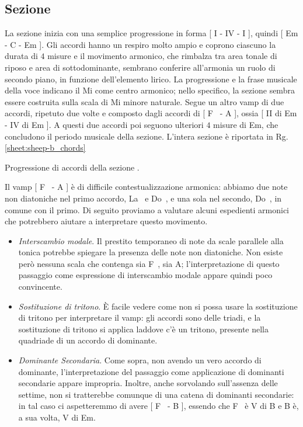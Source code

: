 \documentclass[class=book, crop=false, oneside, 12pt]{standalone}
\begin{document}
    \subsection{Sezione }
    La sezione  inizia con una semplice progressione in forma [ I - IV - I ], quindi [ Em - C - Em ]. Gli accordi hanno un respiro molto ampio e coprono ciascuno la durata di \(4\) misure e il movimento armonico, che rimbalza tra area tonale di riposo e area di sottodominante, sembrano conferire all'armonia un ruolo di secondo piano, in funzione dell'elemento lirico. La progressione e la frase musicale della voce indicano il Mi come centro armonico; nello specifico, la sezione sembra essere costruita sulla scala di Mi minore naturale.
    Segue un altro vamp di due accordi, ripetuto due volte e composto dagli accordi di [ F\sharp~ - A ], ossia [ II di Em - IV di Em ].  A questi due accordi poi seguono ulteriori \(4\) misure di Em, che concludono il periodo musicale della sezione. L'intera sezione è riportata in Rg.\ref{sheet:sheep-b_chords}

    \begin{sheet}[htb]
        \centering
        \caption{Progressione di accordi della sezione .}
        \label{sheet:sheep-b_chords}
    \end{sheet}
    

    Il vamp [ F\sharp~ - A ] è  di difficile contestualizzazione armonica: abbiamo due note non diatoniche nel primo accordo, La\sharp~ e Do\sharp~, e una sola nel secondo, Do\sharp~, in comune con il primo. Di seguito proviamo a valutare alcuni espedienti armonici che potrebbero aiutare a interpretare questo movimento.
    \begin{itemize}
        \item \emph{Interscambio modale}. Il prestito temporaneo di note da scale parallele alla tonica potrebbe spiegare la presenza delle note non diatoniche. Non esiste però nessuna scala che contenga sia F\sharp~, sia A; l'interpretazione di questo passaggio come espressione di interscambio modale appare quindi poco convincente.
        \item \emph{Sostituzione di tritono}. È facile vedere come non si possa usare la sostituzione di tritono per interpretare il vamp: gli accordi sono delle triadi, e la sostituzione di tritono si applica laddove c'è un tritono, presente nella quadriade di un accordo di dominante.
        \item \emph{Dominante Secondaria}. Come sopra, non avendo un vero accordo di dominante, l'interpretazione del passaggio come applicazione di dominanti secondarie appare impropria. Inoltre, anche sorvolando sull'assenza delle settime, non si tratterebbe comunque di una catena di dominanti secondarie: in tal caso ci aspetteremmo di avere [ F\sharp~ - B ], essendo che F\sharp~ è V di B e B è, a sua volta, V di Em.
    \end{itemize}
    
\end{document}
